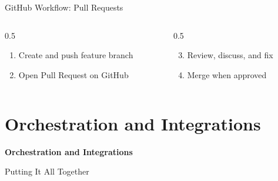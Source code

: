 \documentclass[11pt,aspectratio=169]{beamer}
\begin{document}
\begin{frame}{GitHub Workflow: Pull Requests}
\begin{center}
\begin{tikzpicture}[scale=0.6, transform shape, node distance=2.5cm, auto, thick]
\end{tikzpicture}
\end{center}

\vspace{-0.3cm}
\begin{columns}[t]
    \begin{column}{0.5\textwidth}
        \footnotesize
        \begin{enumerate}
            \item Create and push feature branch
            \item Open Pull Request on GitHub
        \end{enumerate}
    \end{column}
    \begin{column}{0.5\textwidth}
        \footnotesize
        \begin{enumerate}
            \setcounter{enumi}{2}
            \item Review, discuss, and fix
            \item Merge when approved
        \end{enumerate}
    \end{column}
\end{columns}

\end{frame}


\section{Orchestration and Integrations}

\begin{frame}[plain]
    \centering
    \vspace{1cm}
    \textbf{\Huge Orchestration and Integrations}

    \vspace{0.5cm}
    {\Large Putting It All Together}
\end{frame}
\end{document}
